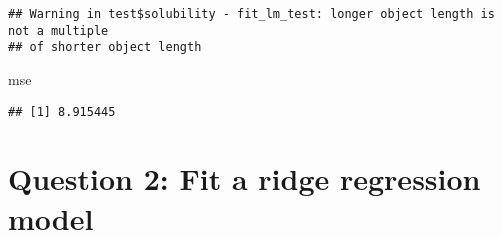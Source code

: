 \documentclass[
]{article}
\newenvironment{Shaded}{\begin{snugshade}}{\end{snugshade}}
\newcommand{\NormalTok}[1]{#1}
\begin{document}
\begin{verbatim}
## Warning in test$solubility - fit_lm_test: longer object length is not a multiple
## of shorter object length
\end{verbatim}

\begin{Shaded}
\begin{Highlighting}[]
\NormalTok{mse}
\end{Highlighting}
\end{Shaded}

\begin{verbatim}
## [1] 8.915445
\end{verbatim}

\hypertarget{question-2-fit-a-ridge-regression-model}{%
\section{Question 2: Fit a ridge regression
model}\label{question-2-fit-a-ridge-regression-model}}
\end{document}
